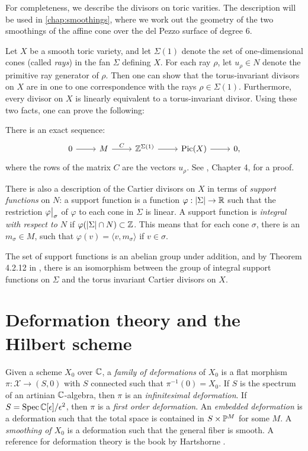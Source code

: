 For completeness, we describe the divisors on toric varities. The description will be used in \cref{chap:smoothings}, where we work out the geometry of the two smoothings of the affine cone over the del Pezzo surface of degree $6$.

Let $X$ be a smooth toric variety, and let $\Sigma(1)$ denote the set of one-dimensional cones (called \emph{rays}) in the fan $\Sigma$ defining $X$. For each ray $\rho$, let $u_\rho \in N$ denote the primitive ray generator of $\rho$. Then one can show that the torus-invariant divisors on $X$ are in one to one correspondence with the rays $\rho \in \Sigma(1)$. Furthermore, every divisor on $X$ is linearly equivalent to a torus-invariant divisor. Using these two facts, one can prove the following:

There is an exact sequence:
\[
\begin{tikzcd}
0 \arrow{r} &  M \arrow{r}{C} & \Z^{\Sigma(1)}\arrow{r} & \Pic(X)   \arrow{r} & 0,
\end{tikzcd}
\]
where the rows of the matrix $C$ are the vectors $u_{\rho}$. See \cite{cox_toric}, Chapter 4, for a proof.

There is also a description of the Cartier divisors on $X$ in terms of \emph{support functions} on $N$: a support function is a function $\varphi:|\Sigma| \to \R$ such that the restriction $\restr{\varphi}{\sigma}$ of $\varphi$ to each cone in $\Sigma$ is linear. A support function is \emph{integral with respect to $N$} if $\varphi(|\Sigma| \cap N) \subset \Z$. This means that for each cone $\sigma$, there is an $m_\sigma \in M$, such that $\varphi(v)=\langle v, m_\sigma \rangle$ if $v \in \sigma$.

The set of support functions is an abelian group under addition, and by Theorem 4.2.12 in \cite{cox_toric}, there is an isomorphism between the group of integral support functions on $\Sigma$ and the torus invariant Cartier divisors on $X$.



\section{Deformation theory and the Hilbert scheme}

Given a scheme $X_0$ over $\C$, a \emph{family of deformations} of $X_0$ is a flat morphism $\pi:\mathscr X \to (S,0)$ with $S$ connected such that $\pi^{-1}(0)=X_0$. If $S$ is the spectrum of an artinian $\C$-algebra, then $\pi$ is an \emph{infinitesimal deformation}. If $S=\Spec \C[\epsilon]/\epsilon^2$, then  $\pi$ is a \emph{first order deformation}. An \emph{embedded deformation} is a deformation such that the total space is contained in $S \times \P^M$ for some $M$. A \emph{smoothing of $X_0$} is a deformation such that the general fiber is smooth. A reference for deformation theory is the book by Hartshorne \cite{hartshorne_deformations}.

